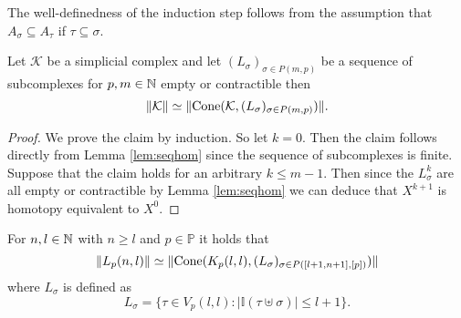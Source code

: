 The well-definedness of the induction step follows from the assumption that $A_\sigma \subseteq A_\tau$ if $\tau \subseteq \sigma$.

\begin{lemma}\label{lem:ecsimeq}
  Let $\mathcal{K}$ be a simplicial complex and let $(L_\sigma)_{\sigma \in P(m,p)}$ be a sequence of subcomplexes for $p,m \in \mathbb{N}$ empty or contractible then \[\lVert \mathcal{K} \rVert \simeq \lVert {\rm Cone}(\mathcal{K}, (L_\sigma)_{\sigma \in P(m,p)})\rVert.\]  
\end{lemma}

\begin{proof}
  We prove the claim by induction. So let $k = 0$. Then the claim follows directly from Lemma \ref{lem:seqhom} since the sequence of subcomplexes is finite.
  Suppose that the claim holds for an arbitrary $k \leq m - 1$. Then since the $L^k_\sigma$ are all empty or contractible by Lemma \ref{lem:seqhom} we can deduce that $X^{k+1}$ is homotopy equivalent to $X^0$.
\end{proof}

\begin{lemma}\label{lem:lnpkll}
  For $n,l \in \mathbb{N}$ with $n \geq l$ and $p \in \mathbb{P}$ it holds that \[\lVert L_p(n,l) \rVert \simeq \lVert {\rm Cone}(K_p(l,l), (L_\sigma)_{\sigma \in P([l+1,n+1],[p])})\rVert \] where $L_\sigma$ is defined as \[L_\sigma = \{\tau\in V_p(l,l)\colon \left|\mathbb{I}(\tau\uplus\sigma)\right| \leq l+1\}.\]
\end{lemma}

